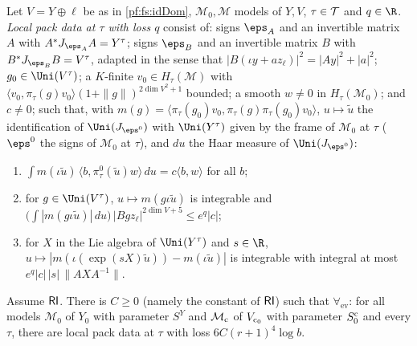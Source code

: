 \begin{definition}\label{pf:fs:locPack}
Let $V=Y\oplus\ell$ be as in \cref{pf:fs:idDom}, $\mathcal M_0,\mathcal M$ models of $Y,V$, $\tau\in\mathcal T$ and $q\in\R$. \emph{Local pack data at $\tau$
with loss $q$} consist of: signs $\eps_A$ and an invertible matrix $A$ with $A^*J_{\eps_A}A=Y^\tau$; signs $\eps_B$ and an invertible matrix $B$
with $B^*J_{\eps_B}B=V^\tau$, adapted in the sense that $|B(\iota y+az_\ell)|^2=|Ay|^2+|a|^2$; $g_0\in\Uni(V^\tau)$; a $K$-finite $v_0\in H_\tau(\mathcal M)$
with $\langle v_0,\pi_\tau(g)v_0\rangle(1+\|g\|)^{2\dim V^2+1}$ bounded; a smooth $w\ne0$ in $H_\tau(\mathcal M_0)$; and $c\ne0$; such that, with
$m(g)=\langle\pi_\tau(g_0)v_0,\pi_\tau(g)\pi_\tau(g_0)v_0\rangle$, $u\mapsto\tilde u$ the identification of $\Uni(J_{\eps^0})$ with $\Uni(Y^\tau)$ given
by the frame of $\mathcal M_0$ at $\tau$ ($\eps^0$ the signs of $\mathcal M_0$ at $\tau$), and $du$ the Haar measure of $\Uni(J_{\eps^0})$:
\begin{enumerate}[label=(\roman*)]
\item $\int m(\iota\tilde u)\,\langle b,\pi^0_\tau(\tilde u)w\rangle\,du=c\langle b,w\rangle$ for all $b$;
\item for $g\in\Uni(V^\tau)$, $u\mapsto m(g\iota\tilde u)$ is integrable and
$\bigl(\int|m(g\iota\tilde u)|\,du\bigr)\,|Bgz_\ell|^{2\dim V+5}\le e^q|c|$;
\item for $X$ in the Lie algebra of $\Uni(Y^\tau)$ and $s\in\R$, $u\mapsto|m(\iota(\exp(sX)\tilde u))-m(\iota\tilde u)|$ is integrable with integral at
most $e^q|c|\,|s|\,\|AXA^{-1}\|$.
\end{enumerate}
\end{definition}

\begin{proposition}\label{pf:fs:locOK}
Assume $\mathsf{RI}$. There is $C\ge0$ (namely the constant of $\mathsf{RI}$) such that $\forall_{\mathrm{ev}}$: for all models $\mathcal M_0$ of $Y_0$ with parameter $S^Y$ and $\mathcal M_{\mathrm{c}}$ of
$V_{\mathrm{c}_0}$ with parameter $S^{\mathrm{c}}_0$ and every $\tau$, there are local pack data at $\tau$ with loss $6C(r+1)^4\log b$.
\end{proposition}

